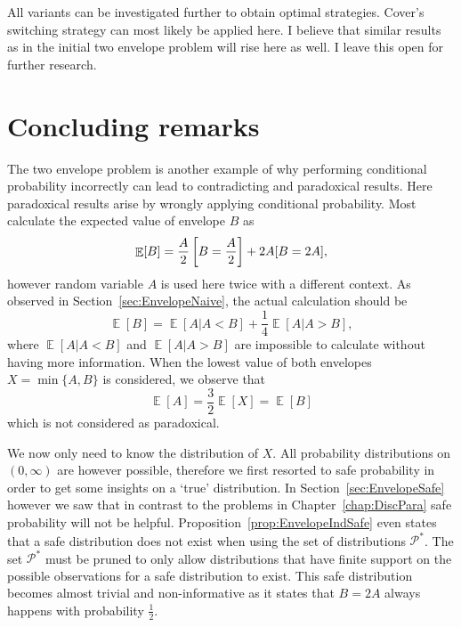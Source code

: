 \documentclass[a4paper]{report}
\theoremstyle{plain}
\theoremstyle{definition}
\theoremstyle{remark}
\numberwithin{equation}{chapter}
\let\P\relax
\DeclareMathOperator{\P}{\mathbb{P}}
\DeclareMathOperator{\E}{\mathbb{E}}
\DeclareMathOperator{\1}{\mathbbm{1}}
\newcommand{\Pmod}{\mathcal{P}^*}
\begin{document}
All variants can be investigated further to obtain optimal strategies. Cover's switching strategy can most likely be applied here. I believe that similar results as in the initial two envelope problem will rise here as well. I leave this open for further research.

\section{Concluding remarks}\label{sec:EnvelopeConcl}
The two envelope problem is another example of why performing conditional probability incorrectly can lead to contradicting and paradoxical results. Here paradoxical results arise by wrongly applying conditional probability. Most calculate the expected value of envelope $B$ as
\begin{equation}
\E[B]=\frac{A}{2}\P\left[B=\frac{A}{2}\right]+2A\P[B=2A],
\end{equation}
however random variable $A$ is used here twice with a different context. As observed in Section~\ref{sec:EnvelopeNaive}, the actual calculation should be
\begin{equation}
\E[B]=\E[A|A<B]+\frac{1}{4}\E[A|A>B],
\end{equation}
where $\E[A|A<B]$ and $\E[A|A>B]$ are impossible to calculate without having more information. When the lowest value of both envelopes $X=\min\{A,B\}$ is considered, we observe that
\begin{equation}
\E[A]=\frac{3}{2}\E[X]=\E[B]
\end{equation}
which is not considered as paradoxical.

We now only need to know the distribution of $X$. All probability distributions on $(0,\infty)$ are however possible, therefore we first resorted to safe probability in order to get some insights on a `true' distribution. In Section~\ref{sec:EnvelopeSafe} however we saw that in contrast to the problems in Chapter~\ref{chap:DiscPara} safe probability will not be helpful. Proposition~\ref{prop:EnvelopeIndSafe} even states that a safe distribution does not exist when using the set of distributions $\Pmod$. The set $\Pmod$ must be pruned to only allow distributions that have finite support on the possible observations for a safe distribution to exist. This safe distribution becomes almost trivial and non-informative as it states that $B=2A$ always happens with probability $\frac{1}{2}$.
\end{document}
